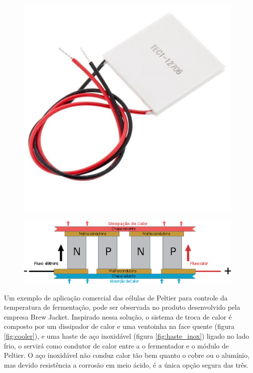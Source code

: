 \begin{figure}[H]
    \centering
    \includegraphics[scale=0.20]{figuras/projeto/hardware/pastilha_peltier.jpeg}
    \label{fig:peltier}
\end{figure}

\begin{figure}[H]
    \centering
    \includegraphics[scale=0.60]{figuras/projeto/hardware/peltier.png}
    \label{fig:esquema_peltier}
\end{figure}


Um exemplo de aplicação comercial das células de Peltier para controle da temperatura de fermentação, pode ser observada no produto desenvolvido pela empresa Brew Jacket. Inspirado nessa solução, o sistema de troca de calor é composto por um dissipador de calor e uma ventoinha na face quente (figura \ref{fig:cooler}), e uma haste de aço inoxidável (figura \ref{fig:haste_inox}) ligado no lado frio, o servirá como condutor de calor entre a o fermentador e o módulo de Peltier. O aço inoxidável não conduz calor tão bem quanto o cobre ou o alumínio, mas devido resistência a corrosão em meio ácido, é a única opção segura das três.


